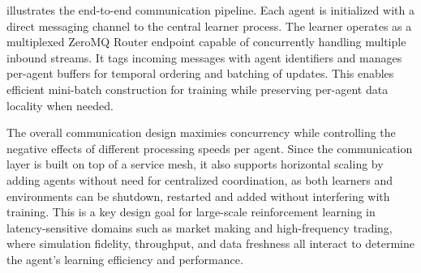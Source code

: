 \documentclass[11pt]{article}
\begin{document}
     illustrates the end-to-end communication pipeline.
    Each agent is initialized with a direct messaging channel to the central learner process.
    The learner operates as a multiplexed ZeroMQ Router endpoint capable of concurrently handling multiple inbound streams.
    It tags incoming messages with agent identifiers and manages per-agent buffers for temporal ordering and batching of updates.
    This enables efficient mini-batch construction for training while preserving per-agent data locality when needed.

    The overall communication design maximies concurrency while controlling the negative effects of different processing speeds per agent.
    Since the communication layer is built on top of a service mesh,
    it also supports horizontal scaling by adding agents without need for centralized coordination,
    as both learners and environments can be shutdown, restarted and added without interfering with training.
    This is a key design goal for large-scale reinforcement learning in latency-sensitive domains such as market making and high-frequency trading,
    where simulation fidelity, throughput, and data freshness all interact to determine the agent’s learning efficiency and performance.
\end{document}
